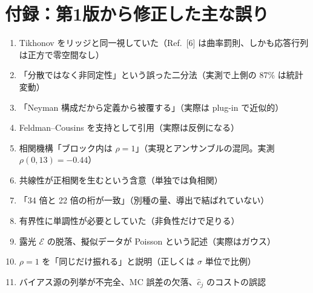 \documentclass[11pt,a4paper]{ltjsarticle}
\begin{document}
\section*{付録：第1版から修正した主な誤り}
\begin{enumerate}\itemsep1pt
\item Tikhonov をリッジと同一視していた（Ref.~[6] は曲率罰則、しかも応答行列は正方で零空間なし）
\item 「分散ではなく非同定性」という誤った二分法（実測で上側の 87\% は統計変動）
\item 「Neyman 構成だから定義から被覆する」（実際は plug-in で近似的）
\item Feldman--Cousins を支持として引用（実際は反例になる）
\item 相関機構「ブロック内は $\rho=1$」（実現とアンサンブルの混同。実測 $\rho(0,13)=-0.44$）
\item 共線性が正相関を生むという含意（単独では負相関）
\item 「34 倍と 22 倍の桁が一致」（別種の量、導出で結ばれていない）
\item 有界性に単調性が必要としていた（非負性だけで足りる）
\item 露光 $\mathcal{E}$ の脱落、擬似データが Poisson という記述（実際はガウス）
\item $\rho=1$ を「同じだけ振れる」と説明（正しくは $\sigma$ 単位で比例）
\item バイアス源の列挙が不完全、MC 誤差の欠落、$\hat c_j$ のコストの誤認
\end{enumerate}
\end{document}
